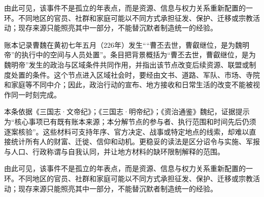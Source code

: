由此可见，该事件不是孤立的年表点，而是资源、信息与权力关系重新配置的一环。不同地区的官员、社群和家庭可能以不同方式承担征发、保护、迁移或宗教活动；现存来源只能照亮其中一部分，不能替沉默者制造统一的经验。

账本记录曹魏在黄初七年五月（226年）发生““曹丕去世，曹叡继位，是为魏明帝”的执行中的空间与人员处置”。条目把背景概括为“曹丕去世，曹叡继位，是为魏明帝”发生的政治与区域条件共同作用，并指出该节点改变后续资源、联盟或制度处置的条件。这个节点进入区域社会时，要经由文书、道路、军队、市场、寺院和家庭等不同中介；因此，政治行动的宣布、地方接收和日常生活的改变不能被视作同一时刻完成。

本条依据《三国志·文帝纪》；《三国志·明帝纪》；《资治通鉴》魏纪，证据提示为“核心事项已有既有账本来源；本分解节点的参与者、执行范围和时间先后仍须逐案核验”。这些材料可支持年序、官方决定、战事或特定地点的线索，却难以直接统计所有人的财富、迁徙、信仰和动机。更稳妥的读法是区分诏令与实施、军报与人口、行政称谓与自我认同，并让地方材料的缺环限制解释的范围。

由此可见，该事件不是孤立的年表点，而是资源、信息与权力关系重新配置的一环。不同地区的官员、社群和家庭可能以不同方式承担征发、保护、迁移或宗教活动；现存来源只能照亮其中一部分，不能替沉默者制造统一的经验。
